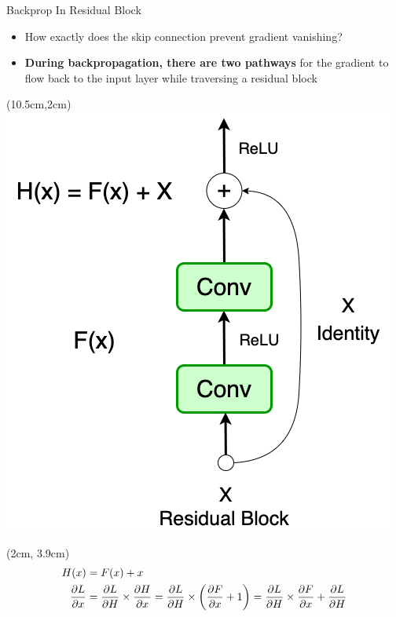 \documentclass[serif, aspectratio=169]{beamer}
\begin{document}
\begin{frame}{Backprop In Residual Block}
	\begin{itemize}
		\item How exactly does the skip connection \newline prevent gradient vanishing?
		\item \textbf{During backpropagation, there are two pathways} \newline for the gradient to flow back to the input layer \newline while traversing a residual block
	\end{itemize}
	
	\begin{textblock*}{5cm}(10.5cm,2cm) %
		\includegraphics[keepaspectratio, scale=0.3]{pic/resBlock3}
	\end{textblock*}

    \begin{textblock*}{10cm}(2cm, 3.9cm) 
		\begin{equation*}
			$$			
			\begin{aligned}
				H(x) & = F(x) + x \\
				\frac{\partial L}{\partial x} & = \frac{\partial L}{\partial H} \times \frac{\partial H}{\partial x} = \frac{\partial L}{\partial H} \times \left( \frac{\partial F}{\partial x} + 1 \right) = \frac{\partial L}{\partial H} \times \frac{\partial F}{\partial x} + \frac{\partial L}{\partial H} \\
			\end{aligned}
			$$
		\end{equation*}
	\end{textblock*}
	

\end{frame}
\end{document}
